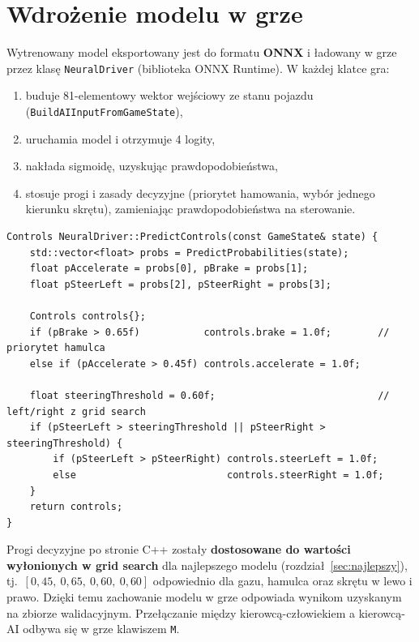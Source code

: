 \documentclass[11pt,a4paper]{article}
\begin{document}
\section{Wdrożenie modelu w grze}
\label{sec:wdrozenie}

Wytrenowany model eksportowany jest do formatu \textbf{ONNX} i ładowany w grze
przez klasę \texttt{NeuralDriver} (biblioteka ONNX Runtime). W każdej klatce gra:
\begin{enumerate}[noitemsep]
  \item buduje 81-elementowy wektor wejściowy ze stanu pojazdu
        (\texttt{BuildAIInput\allowbreak From\allowbreak GameState}),
  \item uruchamia model i otrzymuje 4 logity,
  \item nakłada sigmoidę, uzyskując prawdopodobieństwa,
  \item stosuje progi i zasady decyzyjne (priorytet hamowania, wybór jednego
        kierunku skrętu), zamieniając prawdopodobieństwa na sterowanie.
\end{enumerate}

\noindent\begin{minipage}{\linewidth}
\begin{lstlisting}[style=cpp,caption={Zamiana prawdopodobieństw na sterowanie w grze (fragment \texttt{NeuralDriver.cpp}). Progi dostosowano do wartości z grid search.}]
Controls NeuralDriver::PredictControls(const GameState& state) {
    std::vector<float> probs = PredictProbabilities(state);
    float pAccelerate = probs[0], pBrake = probs[1];
    float pSteerLeft = probs[2], pSteerRight = probs[3];

    Controls controls{};
    if (pBrake > 0.65f)           controls.brake = 1.0f;        // priorytet hamulca
    else if (pAccelerate > 0.45f) controls.accelerate = 1.0f;

    float steeringThreshold = 0.60f;                            // left/right z grid search
    if (pSteerLeft > steeringThreshold || pSteerRight > steeringThreshold) {
        if (pSteerLeft > pSteerRight) controls.steerLeft = 1.0f;
        else                          controls.steerRight = 1.0f;
    }
    return controls;
}
\end{lstlisting}
\end{minipage}

Progi decyzyjne po stronie C++ zostały \textbf{dostosowane do wartości wyłonionych
w grid search} dla najlepszego modelu (rozdział~\ref{sec:najlepszy}),
tj.\ $[0{,}45,\ 0{,}65,\ 0{,}60,\ 0{,}60]$ odpowiednio dla gazu, hamulca oraz skrętu
w lewo i prawo. Dzięki temu zachowanie modelu w grze odpowiada wynikom uzyskanym na
zbiorze walidacyjnym. Przełączanie między kierowcą-człowiekiem a kierowcą-AI odbywa
się w grze klawiszem \texttt{M}.
\end{document}
